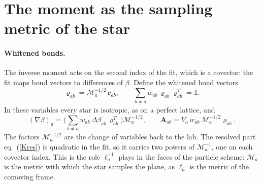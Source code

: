 \documentclass[11pt,aps,preprint,nofootinbib,superscriptaddress,tightenlines]{revtex4-2}
\newcommand{\one}{\mathds{1}}
\def\st{\begin{equation}}
\def\stp{\end{equation}}
\def\Eq#1{eq.~(\ref{#1})}
\let\oldparagraph\paragraph
\renewcommand{\paragraph}{\par\bigskip\oldparagraph}
\begin{document}
\section{The moment as the sampling metric of the star}
\label{sec:metric}

\paragraph{Whitened bonds.}  The inverse moment acts on the second index of the fit, which is a covector: the fit maps bond vectors to
differences of $\beta$.  Define the whitened bond vectors
\st
\varrho_{ab}=\mathcal M_a^{-1/2}\,\bm r_{ab},\qquad \sum_{b\neq a}w_{ab}\,\varrho_{ab}\varrho_{ab}^T=\one .
\stp
In these variables every star is isotropic, as on a perfect lattice, and
\st
(\nabla\beta)_a=\Big(\sum_{b\neq a}w_{ab}\,\Delta\beta_{ab}\,\varrho_{ab}^T\Big)\mathcal M_a^{-1/2},\qquad
\bm A_{ab}=V_a\,w_{ab}\,\mathcal M_a^{-1/2}\varrho_{ab} .
\stp
The factors $\mathcal M_a^{-1/2}$ are the change of variables back to the lab.  The resolved part \Eq{Kres} is quadratic in the fit, so it
carries two powers of $\mathcal M_a^{-1}$, one on each covector index.  This is the role $\ell_a^{-1}$ plays in the faces of the particle scheme:
$\mathcal M_a$ is the metric with which the star samples the plane, as $\ell_a$ is the metric of the comoving frame.
\end{document}
